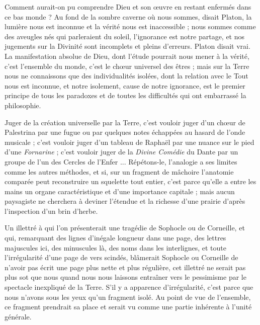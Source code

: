 \documentclass[a4paper, 11pt, oneside]{article}
\begin{document}
Comment aurait-on pu comprendre Dieu et son œuvre en restant enfermés dans ce bas monde ? Au fond de la sombre caverne où nous sommes, disait Platon, la lumière nous est inconnue et la vérité nous est inaccessible ; nous sommes comme des aveugles nés qui parleraient du soleil, l'ignorance est notre partage, et nos jugements sur la Divinité sont incomplets et pleins d'erreurs. Platon disait vrai. La manifestation absolue de Dieu, dont l'étude pourrait nous mener à la vérité, c'est l'ensemble du monde, c'est le chœur universel des êtres ; mais sur la Terre nous ne connaissons que des individualités isolées, dont la relation avec le Tout nous est inconnue, et notre isolement, cause de notre ignorance, est le premier principe de tous les paradoxes et de toutes les difficultés qui ont embarrassé la philosophie.

Juger de la création universelle par la Terre, c'est vouloir juger d'un chœur de Palestrina par une fugue ou par quelques notes échappées au hasard de l'onde musicale ; c'est vouloir juger d'un tableau de Raphaël par une nuance sur le pied d'une \emph{Fornarine} ; c'est vouloir juger de la \emph{Divine Comédie} du Dante par un groupe de l'un des Cercles de l'Enfer ... Répétons-le, l'analogie a ses limites comme les autres méthodes, et si, sur un fragment de mâchoire l'anatomie comparée peut reconstruire un squelette tout entier, c'est parce qu'elle a entre les mains un organe caractéristique et d'une importance capitale ; mais aucun paysagiste ne cherchera à deviner l'étendue et la richesse d'une prairie d'après l'inspection d'un brin d'herbe.

Un illettré à qui l'on présenterait une tragédie de Sophocle ou de Corneille, et qui, remarquant des lignes d'inégale longueur dans une page, des lettres majuscules ici, des minuscules là, des noms dans les interlignes, et toute l'irrégularité d'une page de vers scindés, blâmerait Sophocle ou Corneille de n'avoir pas écrit une page plus nette et plus régulière, cet illettré ne serait pas plus sot que nous quand nous nous laissons entraîner vers le pessimisme par le spectacle inexpliqué de la Terre. S'il y a apparence d'irrégularité, c'est parce que nous n'avons sous les yeux qu'un fragment isolé. Au point de vue de l'ensemble, ce fragment prendrait sa place et serait vu comme une partie inhérente à l'unité générale.
\end{document}
